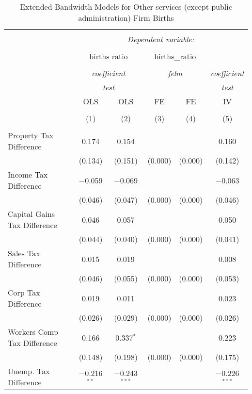 
\begin{table}[!htbp] \centering 
  \caption{Extended Bandwidth Models for  Other services (except public administration) Firm Births} 
  \label{} 
\begin{tabular}{@{\extracolsep{5pt}}lccccc} 
\\[-1.8ex]\hline 
\hline \\[-1.8ex] 
 & \multicolumn{5}{c}{\textit{Dependent variable:}} \\ 
\cline{2-6} 
\\[-1.8ex] & \multicolumn{2}{c}{births ratio} & \multicolumn{2}{c}{births\_ratio} &   \\ 
\\[-1.8ex] & \multicolumn{2}{c}{\textit{coefficient}} & \multicolumn{2}{c}{\textit{felm}} & \textit{coefficient} \\ 
 & \multicolumn{2}{c}{\textit{test}} & \multicolumn{2}{c}{\textit{}} & \textit{test} \\ 
 & OLS & OLS & FE & FE & IV \\ 
\\[-1.8ex] & (1) & (2) & (3) & (4) & (5)\\ 
\hline \\[-1.8ex] 
 Property Tax Difference & 0.174 & 0.154 &  &  & 0.160 \\ 
  & (0.134) & (0.151) & (0.000) & (0.000) & (0.142) \\ 
  Income Tax Difference & $-$0.059 & $-$0.069 &  &  & $-$0.063 \\ 
  & (0.046) & (0.047) & (0.000) & (0.000) & (0.046) \\ 
  Capital Gains Tax Difference & 0.046 & 0.057 &  &  & 0.050 \\ 
  & (0.044) & (0.040) & (0.000) & (0.000) & (0.041) \\ 
  Sales Tax Difference & 0.015 & 0.019 &  &  & 0.008 \\ 
  & (0.046) & (0.055) & (0.000) & (0.000) & (0.053) \\ 
  Corp Tax Difference & 0.019 & 0.011 &  &  & 0.023 \\ 
  & (0.026) & (0.029) & (0.000) & (0.000) & (0.026) \\ 
  Workers Comp Tax Difference & 0.166 & 0.337$^{*}$ &  &  & 0.223 \\ 
  & (0.148) & (0.198) & (0.000) & (0.000) & (0.175) \\ 
  Unemp. Tax Difference & $-$0.216$^{**}$ & $-$0.243$^{***}$ &  &  & $-$0.226$^{***}$ \\ 

\end{tabular}
\end{table}

